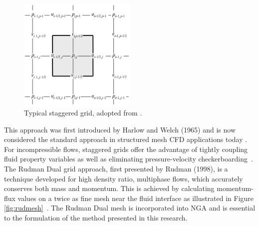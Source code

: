  \begin{figure}[h!]
 	\centering
 	\includegraphics[width=0.5\textwidth]{figs/StaggeredGrid}
 	\caption{Typical staggered grid, adopted from \cite{TRYG}.}
 	\label{fig:StagGrid}
 \end{figure}

\noindent This approach was first introduced by Harlow and Welch (1965) and is now considered the standard approach in structured mesh CFD applications today \cite{HARLOW1965}. For incompressible flows, staggered grids offer the advantage of tightly coupling fluid property variables as well as eliminating pressure-velocity checkerboarding~\cite{rudman}. The Rudman Dual grid approach, first presented by Rudman (1998), is a technique developed for high density ratio, multiphase flows, which accurately conserves both mass and momentum. This is achieved by calculating momentum-flux values on a twice as fine mesh near the fluid interface as illustrated in Figure \ref{fig:rudmesh}~\cite{Rudman}. The Rudman Dual mesh is incorporated into NGA and is essential to the formulation of the method presented in this research.

